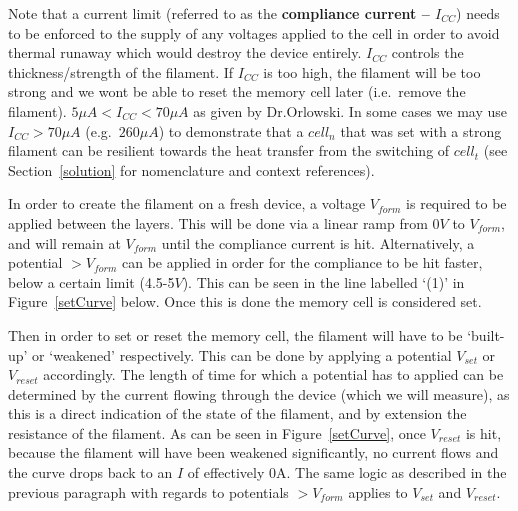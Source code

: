 \documentclass{article}
\begin{document}
          Note that a current limit (referred to as the \textbf{compliance current -- $I_{CC}$}) needs to be enforced to
          the supply of any voltages applied to the cell in order to avoid thermal runaway which would destroy the
          device entirely. $I_{CC}$ controls the thickness/strength of the filament. If $I_{CC}$ is too high, the
          filament will be too strong and we wont be able to reset the memory cell later (i.e.\ remove the filament).
          $5\mu A < I_{CC} < 70\mu A$ as given by Dr.Orlowski. In some cases we may use $I_{CC} > 70\mu A$ (e.g.\
          $260\mu A$) to demonstrate that a $cell_n$ that was set with a strong filament can be resilient towards the
          heat transfer from the switching of $cell_t$ (see Section~\ref{solution} for nomenclature and context
          references).

          In order to create the filament on a fresh device, a voltage $V_{form}$ is required to be applied between the
          layers. This will be done via a linear ramp from $0V$ to $V_{form}$, and will remain at $V_{form}$ until the
          compliance current is hit. Alternatively, a potential $> V_{form}$ can be applied in order for the compliance
          to be hit faster, below a certain limit (4.5-5$V$). This can be seen in the line labelled `(1)' in
          Figure~\ref{setCurve} below. Once this is done the memory cell is considered set.

          Then in order to set or reset the memory cell, the filament will have to be `built-up' or `weakened'
          respectively. This can be done by applying a potential $V_{set}$ or $V_{reset}$ accordingly. The length of
          time for which a potential has to applied can be determined by the current flowing through the device (which
          we will measure), as this is a direct indication of the state of the filament, and by extension the resistance
          of the filament. As can be seen in Figure~\ref{setCurve}, once $V_{reset}$ is hit, because the filament will
          have been weakened significantly, no current flows and the curve drops back to an $I$ of effectively 0A. The
          same logic as described in the previous paragraph with regards to potentials $> V_{form}$ applies to $V_{set}$
          and $V_{reset}$.
\end{document}
